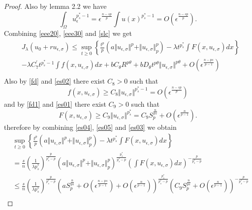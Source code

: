 \documentclass[10pt,twoside,reqno,centertags,draft]{amsart}
\begin{document}
\begin{proof}
Also  by \cite{mosconi2016brezis} lemma 2.2 we have
\begin{equation}\label{es02}
\int_{\Omega} u_{\epsilon}^{p_s^* -1} = \epsilon^{\frac{n -sp}{p}}\int u(x)^{p_s^* -1} =O(\epsilon^{\frac{n -sp}{p}}).
\end{equation}
Combining \ref{eee20}, \ref{eee30} and \ref{slc} we get
\begin{equation*}
\begin{aligned}
& J_{\lambda}(u_0 +ru_{\epsilon,\sigma}) \leq \sup_{t \geq 0}\left\lbrace \frac{t^{p}}{p}\left( a\Vert u_{\epsilon,\sigma}\Vert^{p} +\Vert u_{\epsilon,\sigma}\Vert^{p}_{p}\right) -\lambda t^{p_s^*}\int F(x,u_{\epsilon,\sigma})dx\right\rbrace \\
&-\lambda C^{\prime}_{7} t^{p_s^* -1}\int f(x, u_{\epsilon,\sigma}) dx +bC_{\theta}R^{p\theta} +b D_{\theta} t^{p\theta}\Vert u_{\epsilon,\sigma}\Vert^{p\theta} +O(\epsilon^{\frac{n -ps}{p -1}})\\
\end{aligned}
\end{equation*} 
Also by \ref{fd} and \ref{es02} there exist $C_8 >0$ such that 
\begin{equation}\label{es04}
f(x,u_{\epsilon,\sigma}) \geq C_{8} \Vert u_{\epsilon,\sigma}\Vert^{p_s^* -1} =O(\epsilon^{\frac{n -sp}{p}})
\end{equation}
and by \ref{fd1} and \ref{es01} there exist $ C_9 >0$ such that 
\begin{equation}\label{es05}
F(x,u_{\epsilon,\sigma}) \geq C_{9}\Vert u_{\epsilon,\sigma}\Vert^{p_s^*} = C_{9}  S_{p}^{\frac{n}{ps}} +O(\epsilon^{\frac{n}{p -1}}).
\end{equation}
therefore by combining \ref{es04}, \ref{es05} and \ref{es03} we obtain
\begin{equation*}
\begin{aligned}
&\sup_{t \geq 0}\left\lbrace \frac{t^{p}}{p}\left( a\Vert u_{\epsilon,\sigma}\Vert^{p} +\Vert u_{\epsilon,\sigma}\Vert^{p}_{p}\right) -\lambda t^{p_s^*}\int F(x,u_{\epsilon,\sigma})dx\right\rbrace\\
&=\frac{s}{n}\left( \frac{1}{\lambda p_s^*}\right)^{\frac{p}{p_s^* -p}}\left(  a\Vert u_{\epsilon,\sigma}\Vert^{p} +\Vert u_{\epsilon,\sigma}\Vert^{p}_{p}\right)^{\frac{p_s^*}{p_s^* -p}}\left( \int F(x,u_{\epsilon,\sigma})dx\right)^{-\frac{p}{p_s^* -p}}\\
&\leq \frac{s}{n}\left( \frac{1}{\lambda p_s^*}\right)^{\frac{p}{p_s^* -p}}\left( a S_{p}^{\frac{n}{ps}} +O(\epsilon^{ \frac{n -ps}{p -1}}) +O(\epsilon^{\frac{n}{p -1}})\right)^{\frac{p_s^*}{p_s^* -p}}\left(C_{9} S_{p}^{\frac{n}{ps}} +O(\epsilon^{ \frac{n}{p -1}})\right)^{-\frac{p}{p_s^* -p}}\\

\end{aligned}
\end{equation*}
\end{proof}
\end{document}
